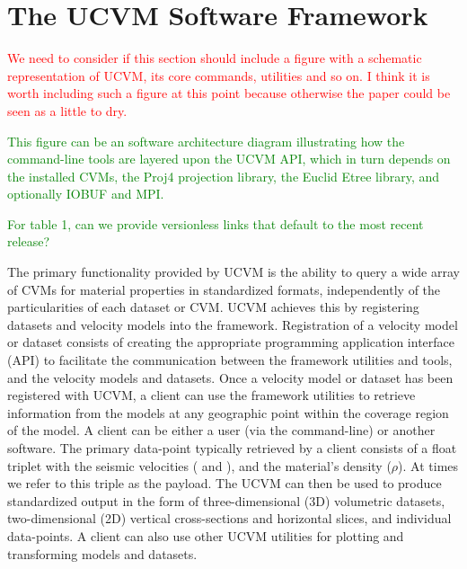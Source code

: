 


\section{The UCVM Software Framework}\label{sec:ucvm}

\textcolor{red}{We need to consider if this section should include a figure with a schematic representation of UCVM, its core commands, utilities and so on. I think it is worth including such a figure at this point because otherwise the paper could be seen as a little to dry.}

\textcolor{green}{This figure can be an software architecture diagram illustrating how the command-line tools are layered upon the UCVM API, which in turn depends on the installed CVMs,}
\textcolor{green}{the Proj4 projection library, the Euclid Etree library, and optionally IOBUF and MPI.}

\textcolor{green}{For table 1, can we provide versionless links that default to the most recent release?}

The primary functionality provided by UCVM is the ability to query a wide array of CVMs for material properties in standardized formats, independently of the particularities of each dataset or CVM. UCVM achieves this by registering datasets and velocity models into the framework. Registration of a velocity model or dataset consists of creating the appropriate programming application interface (API) to facilitate the communication between the framework utilities and tools, and the velocity models and datasets. Once a velocity model or dataset has been registered with UCVM, a client can use the framework utilities to retrieve information from the models at any geographic point within the coverage region of the model. A client can be either a user (via the command-line) or another software. The primary data-point typically retrieved by a client consists of a float triplet with the seismic velocities (\vp{} and \vs{}), and the material's density ($\rho$). At times we refer to this triple as the payload. The UCVM can then be used to produce standardized output in the form of three-dimensional (3D) volumetric datasets, two-dimensional (2D) vertical cross-sections and horizontal slices, and individual data-points. A client can also use other UCVM utilities for plotting and transforming models and datasets.

